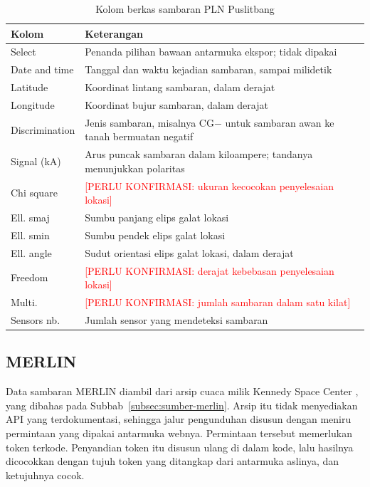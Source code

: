 \begin{table}[!t]
  \caption{Kolom berkas sambaran PLN Puslitbang}
  \label{tab:kolom-pln}
  \footnotesize
  \begin{tabular}{ | l | p{} | }
    \hline
    Kolom & Keterangan \\
    \hline
    Select & Penanda pilihan bawaan antarmuka ekspor; tidak dipakai \\
    Date and time & Tanggal dan waktu kejadian sambaran, sampai milidetik \\
    Latitude & Koordinat lintang sambaran, dalam derajat \\
    Longitude & Koordinat bujur sambaran, dalam derajat \\
    Discrimination & Jenis sambaran, misalnya CG$-$ untuk sambaran awan ke tanah bermuatan negatif \\
    Signal (kA) & Arus puncak sambaran dalam kiloampere; tandanya menunjukkan polaritas \\
    Chi square & \textcolor{red}{[PERLU KONFIRMASI: ukuran kecocokan penyelesaian lokasi]} \\
    Ell. smaj & Sumbu panjang elips galat lokasi \\
    Ell. smin & Sumbu pendek elips galat lokasi \\
    Ell. angle & Sudut orientasi elips galat lokasi, dalam derajat \\
    Freedom & \textcolor{red}{[PERLU KONFIRMASI: derajat kebebasan penyelesaian lokasi]} \\
    Multi. & \textcolor{red}{[PERLU KONFIRMASI: jumlah sambaran dalam satu kilat]} \\
    Sensors nb. & Jumlah sensor yang mendeteksi sambaran \\
    \hline
  \end{tabular}
\end{table}

\subsection{MERLIN}
\label{subsec:merlin}
Data sambaran MERLIN diambil dari arsip cuaca milik Kennedy Space Center \autocite{ksc2026merlin}, yang dibahas pada Subbab~\ref{subsec:sumber-merlin}.
Arsip itu tidak menyediakan API yang terdokumentasi, sehingga jalur pengunduhan disusun dengan meniru permintaan yang dipakai antarmuka webnya.
Permintaan tersebut memerlukan token terkode.
Penyandian token itu disusun ulang di dalam kode, lalu hasilnya dicocokkan dengan tujuh token yang ditangkap dari antarmuka aslinya, dan ketujuhnya cocok.

